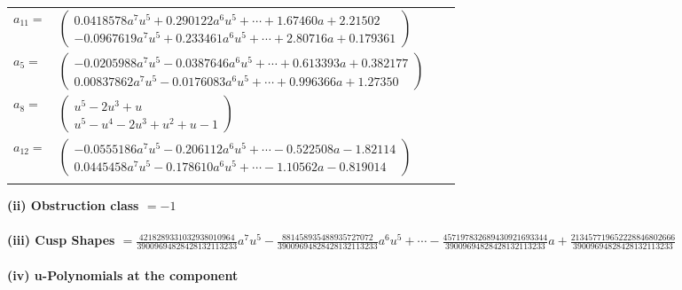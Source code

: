 \documentclass[1p]{elsarticle_modified}
\theoremstyle{definition}
\begin{document}
\begin{tabular}{m{7pt} m{180pt} m{7pt} m{180pt} }
\flushright $a_{11}=$&$\begin{pmatrix}0.0418578 a^{7} u^{5}+0.290122 a^{6} u^{5}+\cdots+1.67460 a+2.21502\\-0.0967619 a^{7} u^{5}+0.233461 a^{6} u^{5}+\cdots+2.80716 a+0.179361\end{pmatrix}$ \\
\flushright $a_{5}=$&$\begin{pmatrix}-0.0205988 a^{7} u^{5}-0.0387646 a^{6} u^{5}+\cdots+0.613393 a+0.382177\\0.00837862 a^{7} u^{5}-0.0176083 a^{6} u^{5}+\cdots+0.996366 a+1.27350\end{pmatrix}$ \\
\flushright $a_{8}=$&$\begin{pmatrix}u^5-2 u^3+u\\u^5- u^4-2 u^3+u^2+u-1\end{pmatrix}$ \\
\flushright $a_{12}=$&$\begin{pmatrix}-0.0555186 a^{7} u^{5}-0.206112 a^{6} u^{5}+\cdots-0.522508 a-1.82114\\0.0445458 a^{7} u^{5}-0.178610 a^{6} u^{5}+\cdots-1.10562 a-0.819014\end{pmatrix}$\\&\end{tabular}
\flushleft \textbf{(ii) Obstruction class $= -1$}\\~\\
\flushleft \textbf{(iii) Cusp Shapes $= \frac{4218289331032938010964}{39009694828428132113233} a^7 u^5-\frac{881458935488935727072}{39009694828428132113233} a^6 u^5+\cdots-\frac{457197832689430921693344}{39009694828428132113233} a+\frac{213457719652228846802666}{39009694828428132113233}$}\\~\\
\newpage\renewcommand{\arraystretch}{1}
\flushleft \textbf{(iv) u-Polynomials at the component}\newline \\
\end{document}
